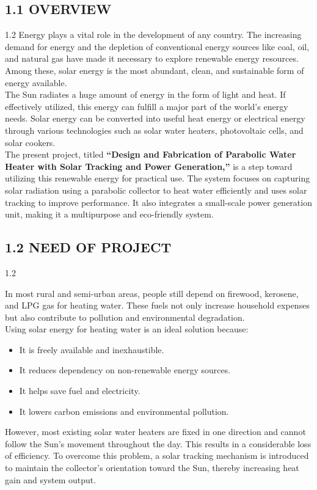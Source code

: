 \documentclass[12pt,a4paper]{article}
\begin{document}
\subsection*{1.1 OVERVIEW}
\noindent
\begin{spacing}{1.2}
{\fontsize{10.5}{14.5}\selectfont
Energy plays a vital role in the development of any country. The increasing demand for energy and the depletion of conventional energy sources like coal, oil, and natural gas have made it necessary to explore renewable energy resources. Among these, solar energy is the most abundant, clean, and sustainable form of energy available.\\[3mm]
The Sun radiates a huge amount of energy in the form of light and heat. If effectively utilized, this energy can fulfill a major part of the world's energy needs. Solar energy can be converted into useful heat energy or electrical energy through various technologies such as solar water heaters, photovoltaic cells, and solar cookers.\\[3mm]
The present project, titled \textbf{``Design and Fabrication of Parabolic Water Heater with Solar Tracking and Power Generation,''} is a step toward utilizing this renewable energy for practical use. The system focuses on capturing solar radiation using a parabolic collector to heat water efficiently and uses solar tracking to improve performance. It also integrates a small-scale power generation unit, making it a multipurpose and eco-friendly system.
}
\end{spacing}

\vspace{5mm}
\subsection*{1.2 NEED OF PROJECT}
\noindent
\begin{spacing}{1.2}
{\fontsize{10.5}{14.5}\selectfont
In most rural and semi-urban areas, people still depend on firewood, kerosene, and LPG gas for heating water. These fuels not only increase household expenses but also contribute to pollution and environmental degradation.\\[3mm]
Using solar energy for heating water is an ideal solution because:
\begin{itemize}[leftmargin=8mm, itemsep=1.5mm, label=\textbullet]
  \item It is freely available and inexhaustible.
  \item It reduces dependency on non-renewable energy sources.
  \item It helps save fuel and electricity.
  \item It lowers carbon emissions and environmental pollution.
\end{itemize}
However, most existing solar water heaters are fixed in one direction and cannot follow the Sun's movement throughout the day. This results in a considerable loss of efficiency. To overcome this problem, a solar tracking mechanism is introduced to maintain the collector's orientation toward the Sun, thereby increasing heat gain and system output.
}
\end{spacing}
\clearpage
\end{document}
